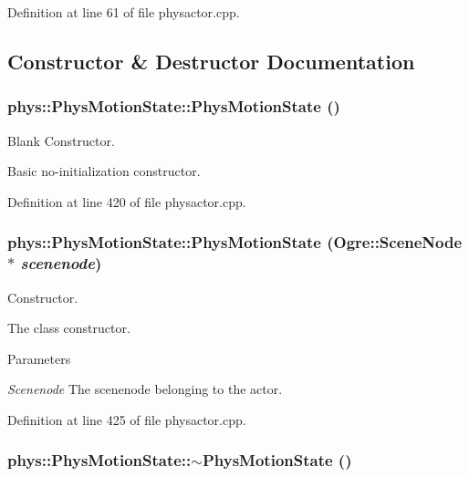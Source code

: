 Definition at line 61 of file physactor.cpp.



\subsection{Constructor \& Destructor Documentation}
\hypertarget{classphys_1_1PhysMotionState_ac685ae94d7ee7740aaee8c1a1132b27a}{
\subsubsection[{PhysMotionState}]{\setlength{\rightskip}{0pt plus 5cm}phys::PhysMotionState::PhysMotionState ()}}
\label{dc/d0d/classphys_1_1PhysMotionState_ac685ae94d7ee7740aaee8c1a1132b27a}


Blank Constructor. 

Basic no-\/initialization constructor. 

Definition at line 420 of file physactor.cpp.

\hypertarget{classphys_1_1PhysMotionState_a505aa5ea3bbaba4710924f030f4ed008}{
\subsubsection[{PhysMotionState}]{\setlength{\rightskip}{0pt plus 5cm}phys::PhysMotionState::PhysMotionState (Ogre::SceneNode $\ast$ {\em scenenode})}}
\label{dc/d0d/classphys_1_1PhysMotionState_a505aa5ea3bbaba4710924f030f4ed008}


Constructor. 

The class constructor. 
\begin{DoxyParams}{Parameters}
\item[{\em Scenenode}]The scenenode belonging to the actor. \end{DoxyParams}


Definition at line 425 of file physactor.cpp.

\hypertarget{classphys_1_1PhysMotionState_a20798e3dce2d71a938c3607a8610eaac}{
\subsubsection[{$\sim$PhysMotionState}]{\setlength{\rightskip}{0pt plus 5cm}phys::PhysMotionState::$\sim$PhysMotionState ()}}
\label{dc/d0d/classphys_1_1PhysMotionState_a20798e3dce2d71a938c3607a8610eaac}



